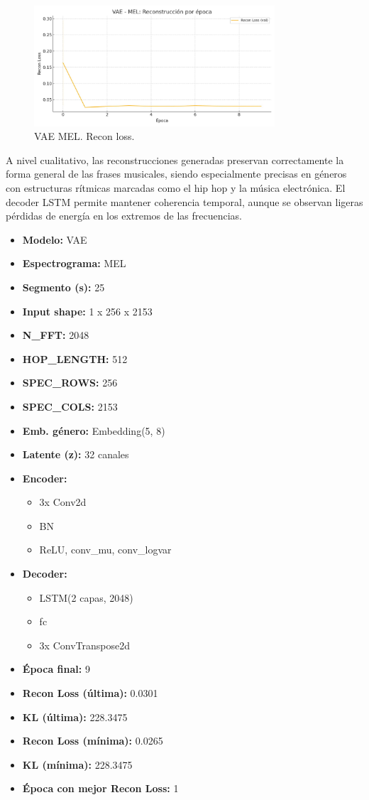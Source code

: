 \begin{figure}[H]
    \centering
    \includegraphics[width=0.8\textwidth]{images/vae_mel_recon_loss_plot.png}
    \caption{VAE MEL. Recon loss.}
\end{figure}

A nivel cualitativo, las reconstrucciones generadas preservan correctamente la forma general de las frases musicales, siendo especialmente precisas en géneros con estructuras rítmicas marcadas como el hip hop y la música electrónica. El decoder LSTM permite mantener coherencia temporal, aunque se observan ligeras pérdidas de energía en los extremos de las frecuencias.

\begin{itemize}
  \item \textbf{Modelo:} VAE
  \item \textbf{Espectrograma:} MEL
  \item \textbf{Segmento (s):} 25
  \item \textbf{Input shape:} 1 x 256 x 2153
  \item \textbf{N\_FFT:} 2048
  \item \textbf{HOP\_LENGTH:} 512
  \item \textbf{SPEC\_ROWS:} 256
  \item \textbf{SPEC\_COLS:} 2153
  \item \textbf{Emb. género:} Embedding(5, 8)
  \item \textbf{Latente (z):} 32 canales
  \item \textbf{Encoder:}
  \begin{itemize}
    \item 3x Conv2d
    \item BN
    \item ReLU, conv_mu, conv_logvar
  \end{itemize}
  \item \textbf{Decoder:}
  \begin{itemize}
    \item LSTM(2 capas, 2048)
    \item fc
    \item 3x ConvTranspose2d
  \end{itemize}
  \item \textbf{Época final:} 9
  \item \textbf{Recon Loss (última):} 0.0301
  \item \textbf{KL (última):} 228.3475
  \item \textbf{Recon Loss (mínima):} 0.0265
  \item \textbf{KL (mínima):} 228.3475
  \item \textbf{Época con mejor Recon Loss:} 1
\end{itemize}

